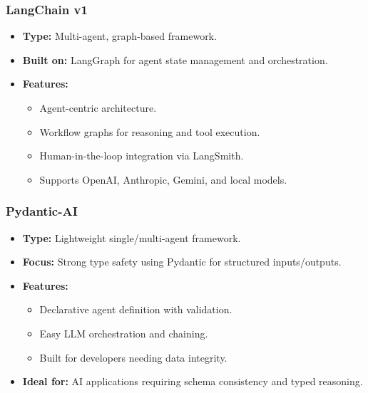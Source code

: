 \begin{frame}[fragile]\frametitle{LangChain v1}
    \begin{itemize}
        \item \textbf{Type:} Multi-agent, graph-based framework.
        \item \textbf{Built on:} LangGraph for agent state management and orchestration.
        \item \textbf{Features:}
              \begin{itemize}
                  \item Agent-centric architecture.
                  \item Workflow graphs for reasoning and tool execution.
                  \item Human-in-the-loop integration via LangSmith.
                  \item Supports OpenAI, Anthropic, Gemini, and local models.
              \end{itemize}
    \end{itemize}
\end{frame}

\begin{frame}[fragile]\frametitle{Pydantic-AI}
    \begin{itemize}
        \item \textbf{Type:} Lightweight single/multi-agent framework.
        \item \textbf{Focus:} Strong type safety using Pydantic for structured inputs/outputs.
        \item \textbf{Features:}
              \begin{itemize}
                  \item Declarative agent definition with validation.
                  \item Easy LLM orchestration and chaining.
                  \item Built for developers needing data integrity.
              \end{itemize}
        \item \textbf{Ideal for:} AI applications requiring schema consistency and typed reasoning.
    \end{itemize}
\end{frame}

